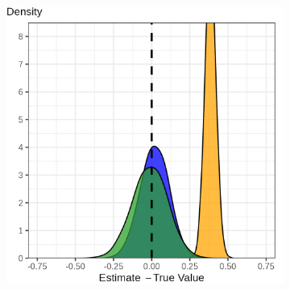 \documentclass[dvipsnames]{beamer} %
\begin{document}
\begin{frame}
{{\begin{figure}
\begin{subfigure}[c]{0.525\textwidth}
                \includegraphics[width=\textwidth]{
                    ../text/sections/figures/uniform-indirect-dist.png}
            \end{subfigure}
        \end{figure}
    }}
\end{frame}
\end{document}
